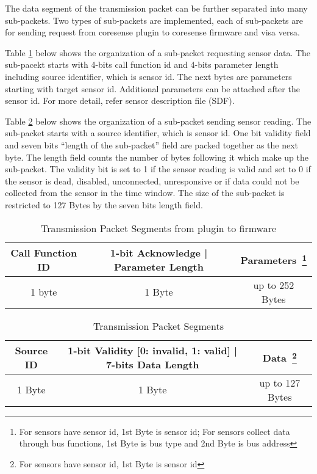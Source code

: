 The data segment of the transmission packet can be further separated into many sub-packets.
Two types of sub-packets are implemented, each of sub-packets are for sending request from coresense plugin to coresense firmware and visa versa.

Table \ref{table:toFW} below shows the organization of a sub-packet requesting sensor data.
The sub-pacekt starts with 4-bits call function id and 4-bits parameter length including source identifier, which is sensor id. The next bytes are parameters starting with target sensor id. Additional parameters can be attached after the sensor id. For more detail, refer sensor description file (SDF).

Table \ref{table:toPlugin} below shows the organization of a sub-packet sending sensor reading.
The sub-packet starts with a source identifier, which is sensor id. One bit validity field and seven bits ``length of the sub-packet'' field are packed together as the next byte. The length field counts the number of bytes following it which make up the sub-packet. 
The validity bit is set to 1 if the sensor reading is valid and set to 0 if the sensor is dead, disabled, unconnected, unresponsive or if data could not be collected
from the sensor in the time window. The size of the sub-packet is restricted to 127 Bytes by the seven bits length field.
\\



\begin{table}[H]
\begin{minipage}{\textwidth}
    \centering
    {
    \begin{tabular}{|c|c|c|}
        \hline
        \rowcolor{black!8}
        \textbf{Call Function ID} & \textbf{1-bit Acknowledge | Parameter Length} & \textbf{Parameters~\footnote{For sensors have sensor id, 1st Byte is sensor id; For sensors collect data through bus functions, 1st Byte is bus type and 2nd Byte is bus address}} \\ \hline
        1 byte & 1 Byte & up to 252 Bytes \\
        \hline
    \end{tabular}
    }
    \caption{Transmission Packet Segments from plugin to firmware}
    \label{table:toFW}
\end{minipage}
\end{table}


\begin{table}[H]
\begin{minipage}{\textwidth}
    \centering
    {
    \begin{tabular}{|c|c|c|}
        \hline
        \rowcolor{black!8}
        \textbf{Source ID} & \textbf{1-bit Validity [0: invalid, 1: valid] | 7-bits Data Length} & \textbf{Data~\footnote{For sensors have sensor id, 1st Byte is sensor id}} \\ \hline
        1 Byte & 1 Byte & up to 127 Bytes \\
        \hline
    \end{tabular}
    }
    \caption{Transmission Packet Segments}
    \label{table:toPlugin}
\end{minipage}
\end{table}



